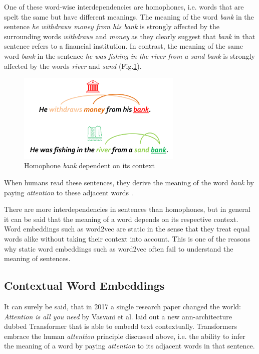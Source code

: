 One of these word-wise interdependencies are homophones, i.e. words that are spelt the same but have different meanings.
The meaning of the word \emph{bank} in the sentence \emph{he withdraws money from his bank} is strongly affected by the surrounding words \emph{withdraws} and \emph{money} as they clearly suggest that \emph{bank} in that sentence refers to a financial institution.
In contrast, the meaning of the same word \emph{bank} in the sentence \emph{he was fishing in the river from a sand bank} is strongly affected by the words \emph{river} and \emph{sand} (Fig.\ref{fig:interdepend}).

\begin{figure}[H]
	\centering
	\includegraphics[width=0.7\textwidth]{Assets/interdepend}
	\caption{Homophone \emph{bank} dependent on its context}
	\label{fig:interdepend}
\end{figure}

When humans read these sentences, they derive the meaning of the word \emph{bank} by paying \emph{attention} to these adjacent words \cite{humanattention}.

There are more interdependencies in sentences than homophones, but in general it can be said that the meaning of a word depends on its respective context.
Word embeddings such as word2vec \cite{word2vec1,word2vec2} are static in the sense that they treat equal words alike without taking their context into account.
This is one of the reasons why static word embeddings such as word2vec often fail to understand the meaning of sentences.

\subsection{Contextual Word Embeddings}\label{subsec:contextual-word-embeddings}
It can surely be said, that in 2017 a single research paper changed the world: \emph{Attention is all you need} by Vasvani et al. \cite{aiayn} laid out a new \gls{ann}-architecture dubbed \gls{Transformer} that is able to embedd text contextually.
Transformers embrace the human \emph{attention} principle discussed above, i.e. the ability to infer the meaning of a word by paying \emph{attention} to its adjacent words in that sentence.

